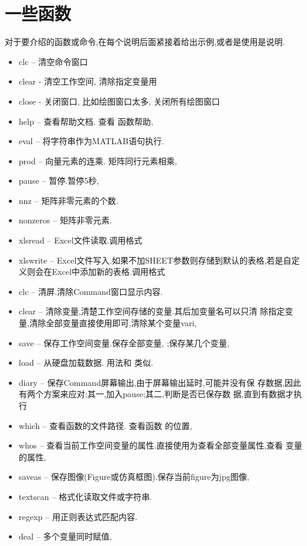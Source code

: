 \section{一些函数}
对于要介绍的函数或命令,在每个说明后面紧接着给出示例,或者是使用是说明.

\begin{itemize}
\item{clc} -- 清空命令窗口
\item{clear} - 清空工作空间, 清除指定变量用 
\item{close} - 关闭窗口, 比如绘图窗口太多, 关闭所有绘图窗口 
\item{help} -- 查看帮助文档. 查看  函数帮助, 
\item{eval} -- 将字符串作为MATLAB语句执行. 
\item{prod} -- 向量元素的连乘. 矩阵同行元素相乘, 
\item{pause} -- 暂停.暂停5秒, 
\item{nnz} -- 矩阵非零元素的个数. 
\item{nonzeros} -- 矩阵非零元素. 
\item{xlsread} -- Excel文件读取.调用格式 
\item{xlswrite} -- Excel文件写入.如果不加SHEET参数则存储到默认的表格,若是自定义则会在Excel中添加新的表格.调用格式 
\item{clc} -- 清屏.清除Command窗口显示内容. 
\item{clear} -- 清除变量,清楚工作空间存储的变量.其后加变量名可以只清
除指定变量,清除全部变量直接使用即可,清除某个变量vari, 
\item{save} -- 保存工作空间变量.保存全部变量, ;保存某几个变量,\\ 
\item{load} -- 从硬盘加载数据. 用法和  类似.
\item{diary} -- 保存Command屏幕输出,由于屏幕输出延时,可能并没有保
存数据,因此有两个方案来应对;其一,加入pause;其二,判断是否已保存数
据,直到有数据才执行 
\item{which} -- 查看函数的文件路径. 查看函数  的位置, 
\item{whos} -- 查看当前工作空间变量的属性.直接使用为查看全部变量属性,查看  变量的属性, 
\item{saveas} -- 保存图像(Figure或仿真框图).保存当前figure为jpg图像, \\ 
\item{textscan} -- 格式化读取文件或字符串.
\item{regexp} -- 用正则表达式匹配内容.
\item{deal} -- 多个变量同时赋值, 
\end{itemize}